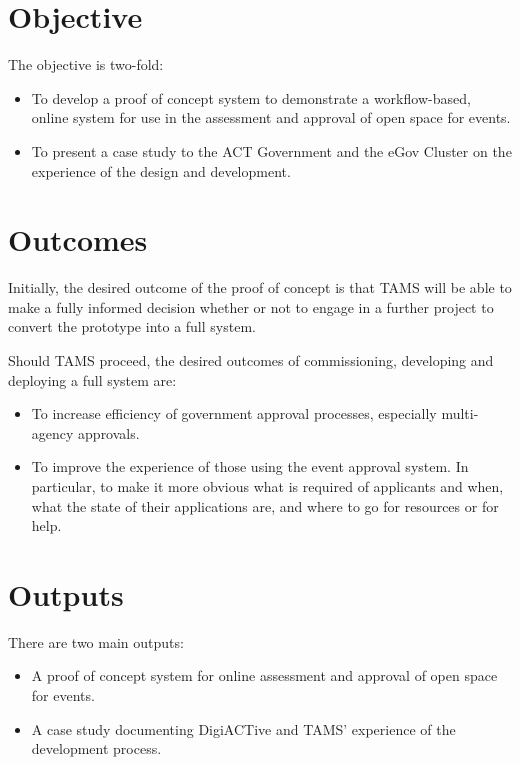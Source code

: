 \documentclass[12pt,a4paper,twosided]{article}
\begin{document}
\section{Objective}

The objective is two-fold:

\begin{itemize}
\itemsep1pt\parskip0pt
\item
  To develop a proof of concept system to demonstrate a workflow-based,
  online system for use in the assessment and approval of open space for
  events.
\item
  To present a case study to the ACT Government and the eGov Cluster on
  the experience of the design and development.
\end{itemize}

\section{Outcomes}

Initially, the desired outcome of the proof of concept is that TAMS will
be able to make a fully informed decision whether or not to engage in a
further project to convert the prototype into a full system.

Should TAMS proceed, the desired outcomes of commissioning, developing
and deploying a full system are:

\begin{itemize}
\itemsep1pt\parskip0pt
\item
  To increase efficiency of government approval processes, especially
  multi-agency approvals.
\item
  To improve the experience of those using the event approval system. In
  particular, to make it more obvious what is required of applicants and
  when, what the state of their applications are, and where to go for
  resources or for help.
\end{itemize}

\section{Outputs}

There are two main outputs:

\begin{itemize}
\itemsep1pt\parskip0pt
\item
  A proof of concept system for online assessment and approval of open
  space for events.
\item
  A case study documenting DigiACTive and TAMS' experience of the
  development process.
\end{itemize}
\end{document}
